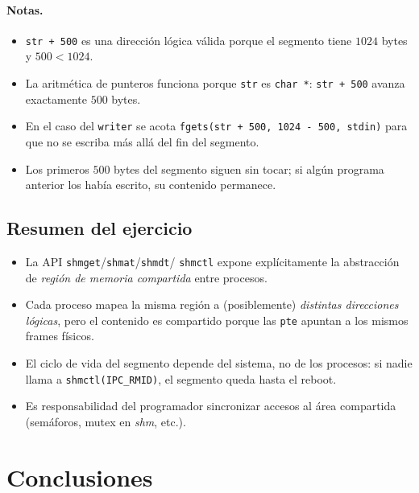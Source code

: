 \documentclass[11pt,a4paper]{article}
\begin{document}
\paragraph{Notas.}

\begin{itemize}[leftmargin=*,nosep]
    \item \texttt{str + 500} es una dirección lógica válida porque el
        segmento tiene $1024$ bytes y $500 < 1024$.
    \item La aritmética de punteros funciona porque \texttt{str} es
        \texttt{char *}: \texttt{str + 500} avanza exactamente $500$
        bytes.
    \item En el caso del \texttt{writer} se acota
        \texttt{fgets(str + 500, 1024 - 500, stdin)} para que no se
        escriba más allá del fin del segmento.
    \item Los primeros $500$ bytes del segmento siguen sin tocar; si
        algún programa anterior los había escrito, su contenido
        permanece.
\end{itemize}

\subsection*{Resumen del ejercicio}

\begin{itemize}[leftmargin=*,nosep]
    \item La API \texttt{shmget}/\texttt{shmat}/\texttt{shmdt}/
        \texttt{shmctl} expone explícitamente la abstracción de
        \emph{región de memoria compartida} entre procesos.
    \item Cada proceso mapea la misma región a (posiblemente)
        \emph{distintas direcciones lógicas}, pero el contenido es
        compartido porque las \texttt{pte} apuntan a los mismos
        frames físicos.
    \item El ciclo de vida del segmento depende del sistema, no de
        los procesos: si nadie llama a \texttt{shmctl(IPC\_RMID)}, el
        segmento queda hasta el reboot.
    \item Es responsabilidad del programador sincronizar accesos al
        área compartida (semáforos, mutex en \emph{shm}, etc.).
\end{itemize}

\section{Conclusiones}
\end{document}
